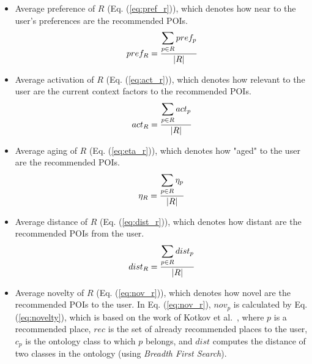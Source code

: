 \begin{itemize}
    \item Average preference of $R$ (Eq. (\ref{eq:pref_r})), which denotes how near to the user's preferences are the recommended POIs.
    \begin{equation} \label{eq:pref_r}
    \footnotesize{
        pref_{R} = \frac{ \displaystyle \sum_{p \in R}{pref_p} }{| R |}
        }
    \end{equation}

    \item Average activation of $R$ (Eq. (\ref{eq:act_r})), which denotes how relevant to the user are the current context factors %
    to the recommended POIs.
    \begin{equation} \label{eq:act_r}
        \footnotesize{
        act_{R} = \frac{ \displaystyle \sum_{p \in R}{act_p} }{| R |}
        }
    \end{equation}

    \item Average aging of $R$ (Eq. (\ref{eq:eta_r})), which denotes how "aged" to the user are the recommended POIs.
    \begin{equation} \label{eq:eta_r}
        \footnotesize{
    \eta_{R} = \frac{ \displaystyle \sum_{p \in R}{\eta_p} }{| R |}
    }
    \end{equation}

    \item Average distance of $R$ (Eq. (\ref{eq:dist_r})), which denotes how distant are the recommended POIs from the user.
    \begin{equation} \label{eq:dist_r}
        \footnotesize{
        dist_{R} = \frac{ \displaystyle \sum_{p \in R}{dist_{p}} }{| R |}
        }
    \end{equation}

    \item Average novelty of $R$ (Eq. (\ref{eq:nov_r})), which denotes how novel are the recommended POIs to the user. In Eq. (\ref{eq:nov_r}), $nov_{p}$ is calculated by Eq. (\ref{eq:novelty}), which is based on the work of Kotkov et al.~\cite{kotkov2016survey}, where $p$ is a recommended place, $rec$ is the set of already recommended places to the user, $c_p$ is the ontology class to which $p$ belongs, and $dist$ computes the distance of two classes in the ontology (using \textit{Breadth First Search}).


\end{itemize}
